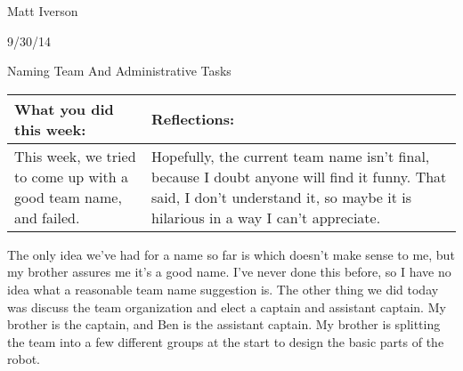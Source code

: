 Matt Iverson

9/30/14

Naming Team And Administrative Tasks

\begin{tabular}{|p{5cm}|p{5cm}|}
 \hline
 What you did this week: &
 Reflections: \\
 \hline
 This week, we tried to come up with a good team name, and failed. &
 Hopefully, the current team name isn’t final, because I doubt anyone will find it funny. That said, I don’t understand it, so maybe it is hilarious in a way I can’t appreciate. \\
 \hline
\end{tabular}

The only idea we’ve had for a name so far is
which doesn’t make sense to me, but my brother assures me it’s a good name. I’ve never done this before, so I have no idea what a reasonable team name suggestion is.
	The other thing we did today was discuss the team organization and elect a captain and assistant captain. My brother is the captain, and Ben is the assistant captain. My brother is splitting the team into a few different groups at the start to design the basic parts of the robot.

